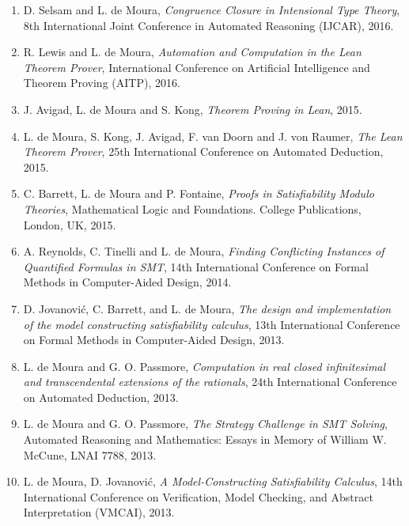 \documentclass[11pt,a4paper]{article}
\begin{document}
\begin{enumerate}[leftmargin=*,itemsep=0.5ex,topsep=0.6ex]
\item D. Selsam and L. de Moura,
      {\em Congruence Closure in Intensional Type Theory},
      8th International Joint Conference in Automated Reasoning (IJCAR), 2016.

\item R. Lewis and L. de Moura,
      {\em Automation and Computation in the Lean Theorem Prover},
      International Conference on Artificial Intelligence and Theorem Proving (AITP), 2016.

\item J. Avigad, L. de Moura and S. Kong,
      {\em Theorem Proving in Lean}, 2015.

\item L. de Moura, S. Kong, J. Avigad, F. van Doorn and J. von Raumer,
      {\em The Lean Theorem Prover},
      25th International Conference on Automated Deduction, 2015.

\item C. Barrett, L. de Moura and P. Fontaine,
      {\em Proofs in Satisfiability Modulo Theories},
      Mathematical Logic and Foundations. College Publications, London, UK, 2015.

\item A. Reynolds, C. Tinelli and L. de Moura,
      {\em Finding Conflicting Instances of Quantified Formulas in SMT},
      14th International Conference on Formal Methods in Computer-Aided Design, 2014.

\item D. Jovanovi\'{c}, C. Barrett, and L. de Moura,
      {\em The design and implementation of the model constructing satisfiability calculus},
      13th International Conference on Formal Methods in Computer-Aided Design, 2013.

\item L. de Moura and G. O. Passmore,
      {\em Computation in real closed infinitesimal and transcendental extensions of the rationals},
      24th International Conference on Automated Deduction, 2013.

\item L. de Moura and G. O. Passmore,
      {\em The Strategy Challenge in SMT Solving},
      Automated Reasoning and Mathematics: Essays in Memory of William W. McCune,
      LNAI 7788, 2013.

\item L. de Moura, D. Jovanovi\'{c},
      {\em A Model-Constructing Satisfiability Calculus},
      14th International Conference on Verification, Model Checking, and Abstract Interpretation (VMCAI), 2013.


\end{enumerate}
\end{document}
